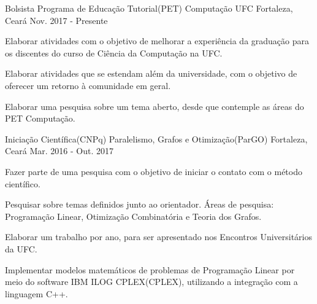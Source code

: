 

\begin{cventries}


  \cventry
    {Bolsista} %
    {Programa de Educação Tutorial(PET) Computação UFC} %
    {Fortaleza, Ceará} %
    {Nov. 2017 - Presente} %
    {
      \begin{cvitems} %
        \item {Elaborar atividades com o objetivo de melhorar a experiência da graduação para os discentes do curso de Ciência da Computação na UFC.}
        \item {Elaborar atividades que se estendam além da universidade, com o objetivo de oferecer um retorno à comunidade em geral.}
        \item {Elaborar uma pesquisa sobre um tema aberto, desde que contemple as áreas do PET Computação.}
      \end{cvitems}
    }
\vskip 0.2cm
  \cventry
    {Iniciação Científica(CNPq)} %
    {Paralelismo, Grafos e Otimização(ParGO)} %
    {Fortaleza, Ceará} %
    {Mar. 2016 - Out. 2017} %
    {
      \begin{cvitems} %
        \item {Fazer parte de uma pesquisa com o objetivo de iniciar o contato com o método científico.}
        \item {Pesquisar sobre temas definidos junto ao orientador. Áreas de pesquisa: Programação Linear, Otimização Combinatória e Teoria dos Grafos.}
        \item {Elaborar um trabalho por ano, para ser apresentado nos Encontros Universitários da UFC.}
        \item {Implementar modelos matemáticos de problemas de Programação Linear por meio do software IBM ILOG CPLEX(CPLEX), utilizando a integração com a linguagem C++.}
      \end{cvitems}
    }
\vskip 0.2cm

\end{cventries}
